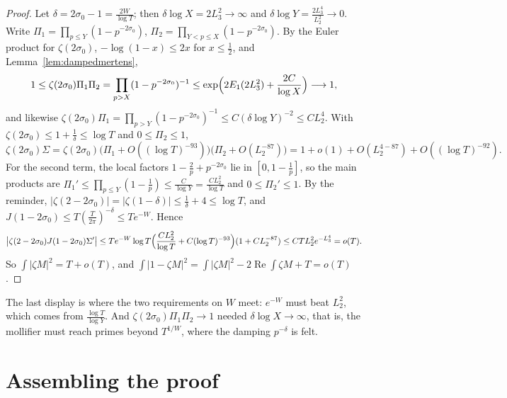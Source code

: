 \begin{proof}
Let $\delta=2\sigma_0-1=\frac{2W}{\log T}$; then $\delta\log X=2L_3^2\to\infty$ and $\delta\log Y=\frac{2L_3^4}{L_2^2}\to0$. Write $\Pi_1=\prod_{p\le Y}(1-p^{-2\sigma_0})$, $\Pi_2=\prod_{Y<p\le X}(1-p^{-2\sigma_0})$. By the Euler product for $\zeta(2\sigma_0)$, $-\log(1-x)\le2x$ for $x\le\frac12$, and Lemma~\ref{lem:dampedmertens},
\[
1\le\zeta(2\sigma_0)\Pi_1\Pi_2=\prod_{p>X}(1-p^{-2\sigma_0})^{-1}\le\exp\Bigl(2E_1(2L_3^2)+\frac{2C}{\log X}\Bigr)\longrightarrow1,
\]
and likewise $\zeta(2\sigma_0)\Pi_1=\prod_{p>Y}(1-p^{-2\sigma_0})^{-1}\le C(\delta\log Y)^{-2}\le CL_2^4$. With $\zeta(2\sigma_0)\le1+\frac1\delta\le\log T$ and $0\le\Pi_2\le1$,
\[
\zeta(2\sigma_0)\Sigma=\zeta(2\sigma_0)\bigl(\Pi_1+O((\log T)^{-93})\bigr)\bigl(\Pi_2+O(L_2^{-87})\bigr)=1+o(1)+O(L_2^{4-87})+O((\log T)^{-92}).
\]
For the second term, the local factors $1-\frac2p+p^{-2\sigma_0}$ lie in $[0,1-\frac1p]$, so the main products are $\Pi_1'\le\prod_{p\le Y}(1-\frac1p)\le\frac C{\log Y}=\frac{CL_2^2}{\log T}$ and $0\le\Pi_2'\le1$. By the reminder, $|\zeta(2-2\sigma_0)|=|\zeta(1-\delta)|\le\frac1\delta+4\le\log T$, and $J(1-2\sigma_0)\le T(\frac T{2\pi})^{-\delta}\le Te^{-W}$. Hence
\[
\bigl|\zeta(2-2\sigma_0)J(1-2\sigma_0)\Sigma'\bigr|\le Te^{-W}\log T\Bigl(\frac{CL_2^2}{\log T}+C(\log T)^{-93}\Bigr)(1+CL_2^{-87})\le CTL_2^2e^{-L_3^4}=o(T).
\]
So $\int|\zeta M|^2=T+o(T)$, and $\int|1-\zeta M|^2=\int|\zeta M|^2-2\operatorname{Re}\int\zeta M+T=o(T)$.
\end{proof}

The last display is where the two requirements on $W$ meet: $e^{-W}$ must beat $L_2^2$, which comes from $\frac{\log T}{\log Y}$. And $\zeta(2\sigma_0)\Pi_1\Pi_2\to1$ needed $\delta\log X\to\infty$, that is, the mollifier must reach primes beyond $T^{1/W}$, where the damping $p^{-\delta}$ is felt.

\section{Assembling the proof}

